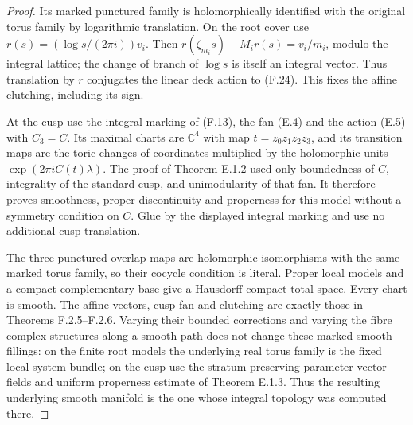 \begin{proof}
Its marked punctured family is holomorphically identified with
the original torus family by logarithmic translation.  On the
root cover use $r(s)=(\log s/(2\pi i))v_i$.  Then
$r(\zeta_{m_i}s)-M_i r(s)=v_i/m_i$, modulo the integral lattice;
the change of branch of $\log s$ is itself an integral vector.
Thus translation by $r$ conjugates the linear deck action to
(F.24).  This fixes the affine clutching, including its sign.

At the cusp use the integral marking of (F.13), the fan (E.4)
and the action (E.5) with $C_3=C$.
Its maximal charts are $\mathbb C^4$ with map
$t=z_0z_1z_2z_3$, and its transition maps are the toric changes
of coordinates multiplied by the holomorphic units
$\exp(2\pi i C(t)\lambda)$.
The proof of Theorem E.1.2 used only boundedness of $C$,
integrality of the standard cusp, and unimodularity of that
fan.  It therefore proves smoothness, proper discontinuity
and properness for this model without a symmetry condition
on $C$.  Glue by the displayed integral marking and use no
additional cusp translation.

The three punctured overlap maps are holomorphic isomorphisms
with the same marked torus family, so their cocycle condition
is literal.  Proper local models and a compact complementary
base give a Hausdorff compact total space.  Every chart is
smooth.  The affine vectors, cusp fan and clutching are exactly
those in Theorems F.2.5--F.2.6.  Varying their bounded corrections
and varying the fibre complex structures along a smooth path
does not change these marked smooth fillings: on the finite
root models the underlying real torus family is the fixed
local-system bundle; on the cusp use the stratum-preserving
parameter vector fields and uniform properness estimate of
Theorem E.1.3.  Thus the resulting underlying smooth manifold
is the one whose integral topology was computed there.
\end{proof}

